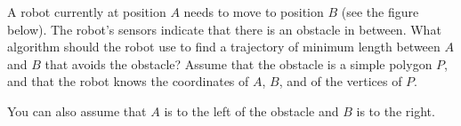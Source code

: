 A robot currently at position $A$ needs to move to position $B$ (see
the figure below).  The robot's sensors indicate that there is an
obstacle in between.  What algorithm should the robot use to find a
trajectory of minimum length between $A$ and $B$ that avoids the
obstacle?  Assume that the obstacle is a simple polygon $P$, and that
the robot knows the coordinates of $A$, $B$, and of the vertices of
$P$. 

You can also assume that $A$ is to the left of the obstacle and $B$ is
to the right.


\vspace{4mm}
\par
\centerline{}
\par
\vspace{4mm}
